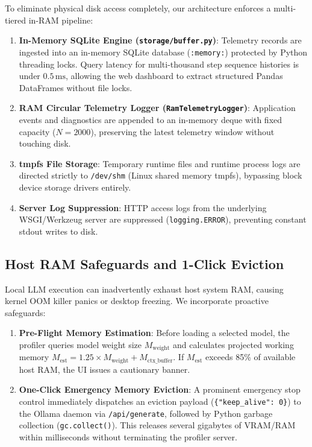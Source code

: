 \documentclass[10pt,twocolumn]{article}
\begin{document}
To eliminate physical disk access completely, our architecture enforces a multi-tiered in-RAM pipeline:
\begin{enumerate}
    \item \textbf{In-Memory SQLite Engine (\texttt{storage/buffer.py})}: Telemetry records are ingested into an in-memory SQLite database (\texttt{:memory:}) protected by Python threading locks. Query latency for multi-thousand step sequence histories is under $0.5\,\text{ms}$, allowing the web dashboard to extract structured Pandas DataFrames without file locks.
    \item \textbf{RAM Circular Telemetry Logger (\texttt{RamTelemetryLogger})}: Application events and diagnostics are appended to an in-memory deque with fixed capacity ($N=2000$), preserving the latest telemetry window without touching disk.
    \item \textbf{tmpfs File Storage}: Temporary runtime files and runtime process logs are directed strictly to \texttt{/dev/shm} (Linux shared memory tmpfs), bypassing block device storage drivers entirely.
    \item \textbf{Server Log Suppression}: HTTP access logs from the underlying WSGI/Werkzeug server are suppressed (\texttt{logging.ERROR}), preventing constant stdout writes to disk.
\end{enumerate}

\subsection{Host RAM Safeguards and 1-Click Eviction}
Local LLM execution can inadvertently exhaust host system RAM, causing kernel OOM killer panics or desktop freezing. We incorporate proactive safeguards:
\begin{enumerate}
    \item \textbf{Pre-Flight Memory Estimation}: Before loading a selected model, the profiler queries model weight size $M_{\text{weight}}$ and calculates projected working memory $M_{\text{est}} = 1.25 \times M_{\text{weight}} + M_{\text{ctx\_buffer}}$. If $M_{\text{est}}$ exceeds 85\% of available host RAM, the UI issues a cautionary banner.
    \item \textbf{One-Click Emergency Memory Eviction}: A prominent emergency stop control immediately dispatches an eviction payload (\texttt{\{"keep\_alive": 0\}}) to the Ollama daemon via \texttt{/api/generate}, followed by Python garbage collection (\texttt{gc.collect()}). This releases several gigabytes of VRAM/RAM within milliseconds without terminating the profiler server.
\end{enumerate}
\end{document}
